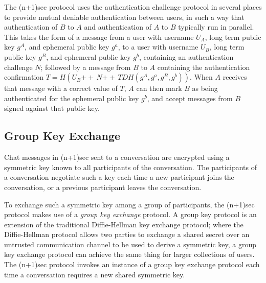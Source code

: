 \documentclass{article}
\def\concat{\mathbin{+\!\!\!+\,}}
\begin{document}
The (n+1)sec protocol uses the authentication challenge protocol in several places to provide mutual deniable authentication between users, in such a way that authentication of $B$ to $A$ and authentication of $A$ to $B$ typically run in parallel.
This takes the form of a message from a user with username $U_A$, long term public key $g^A$, and ephemeral public key $g^a$, to a user with username $U_B$, long term public key $g^B$, and ephemeral public key $g^b$, containing an authentication challenge $N$; followed by a message from $B$ to $A$ containing the authentication confirmation $T = H(U_B \concat N \concat TDH(g^A, g^a, g^B, g^b))$.
When $A$ receives that message with a correct value of $T$, $A$ can then mark $B$ as being authenticated for the ephemeral public key $g^b$, and accept messages from $B$ signed against that public key.





\subsection{Group Key Exchange}
\label{sec:cryptography/group-key-exchange}

Chat messages in (n+1)sec sent to a conversation are encrypted using a symmetric key known to all participants of the conversation.
The participants of a conversation negotiate such a key each time a new participant joins the conversation, or a previous participant leaves the conversation.

To exchange such a symmetric key among a group of participants, the (n+1)sec protocol makes use of a \emph{group key exchange} protocol.
A group key protocol is an extension of the traditional Diffie-Hellman key exchange protocol; where the Diffie-Hellman protocol allows two parties to exchange a shared secret over an untrusted communication channel to be used to derive a symmetric key, a group key exchange protocol can achieve the same thing for larger collections of users.
The (n+1)sec protocol invokes an instance of a group key exchange protocol each time a conversation requires a new shared symmetric key.
\end{document}

